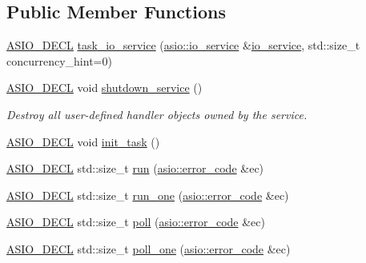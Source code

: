 \subsection*{Public Member Functions}
\begin{DoxyCompactItemize}
\item 
\hyperlink{config_8hpp_ab54d01ea04afeb9a8b39cfac467656b7}{A\+S\+I\+O\+\_\+\+D\+E\+C\+L} \hyperlink{classasio_1_1detail_1_1task__io__service_a881516d09c324a0bcbbc75d9c076e3f7}{task\+\_\+io\+\_\+service} (\hyperlink{classasio_1_1io__service}{asio\+::io\+\_\+service} \&\hyperlink{classasio_1_1io__service}{io\+\_\+service}, std\+::size\+\_\+t concurrency\+\_\+hint=0)
\item 
\hyperlink{config_8hpp_ab54d01ea04afeb9a8b39cfac467656b7}{A\+S\+I\+O\+\_\+\+D\+E\+C\+L} void \hyperlink{classasio_1_1detail_1_1task__io__service_a38bd515b55fdaebdf7b20cb5e161b174}{shutdown\+\_\+service} ()
\begin{DoxyCompactList}\small\item\em Destroy all user-\/defined handler objects owned by the service. \end{DoxyCompactList}\item 
\hyperlink{config_8hpp_ab54d01ea04afeb9a8b39cfac467656b7}{A\+S\+I\+O\+\_\+\+D\+E\+C\+L} void \hyperlink{classasio_1_1detail_1_1task__io__service_a68bc68b32eca978202005e48d2831722}{init\+\_\+task} ()
\item 
\hyperlink{config_8hpp_ab54d01ea04afeb9a8b39cfac467656b7}{A\+S\+I\+O\+\_\+\+D\+E\+C\+L} std\+::size\+\_\+t \hyperlink{classasio_1_1detail_1_1task__io__service_a4eba17975ee01ee1ea8a46f0a5bdfa43}{run} (\hyperlink{classasio_1_1error__code}{asio\+::error\+\_\+code} \&ec)
\item 
\hyperlink{config_8hpp_ab54d01ea04afeb9a8b39cfac467656b7}{A\+S\+I\+O\+\_\+\+D\+E\+C\+L} std\+::size\+\_\+t \hyperlink{classasio_1_1detail_1_1task__io__service_aac7a06b63848276fee7aa18ebfa70594}{run\+\_\+one} (\hyperlink{classasio_1_1error__code}{asio\+::error\+\_\+code} \&ec)
\item 
\hyperlink{config_8hpp_ab54d01ea04afeb9a8b39cfac467656b7}{A\+S\+I\+O\+\_\+\+D\+E\+C\+L} std\+::size\+\_\+t \hyperlink{classasio_1_1detail_1_1task__io__service_aaf23f2e2d036f6e352aebcacb9f6cec4}{poll} (\hyperlink{classasio_1_1error__code}{asio\+::error\+\_\+code} \&ec)
\item 
\hyperlink{config_8hpp_ab54d01ea04afeb9a8b39cfac467656b7}{A\+S\+I\+O\+\_\+\+D\+E\+C\+L} std\+::size\+\_\+t \hyperlink{classasio_1_1detail_1_1task__io__service_a87ca412a09bc0b4631dbd5fc19c23cf9}{poll\+\_\+one} (\hyperlink{classasio_1_1error__code}{asio\+::error\+\_\+code} \&ec)

\end{DoxyCompactItemize}
